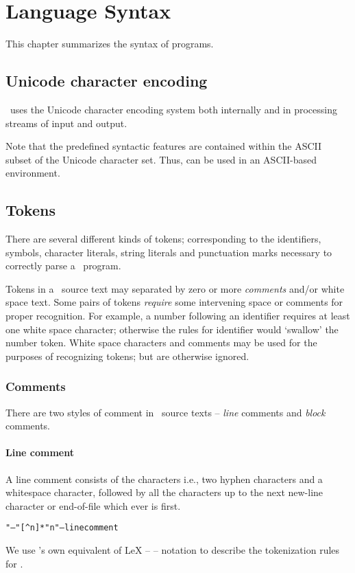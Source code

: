 \chapter{Language Syntax}
\label{grammar}

This chapter summarizes the syntax of \go programs. 

\section{Unicode character encoding}

\go\ uses the Unicode character encoding system \cite{unicode:30} both internally and in processing streams of input and output.

Note that the predefined syntactic features are contained within the ASCII subset of the Unicode character set. Thus, \go can be used in an ASCII-based environment.

\section{Tokens}
There are several different kinds of tokens; corresponding to the identifiers, symbols, character literals, string literals and punctuation marks necessary to correctly parse a \go\ program.


Tokens in a \go\ source text may separated by zero or more \emph{comments} and/or white space text. Some pairs of tokens \emph{require} some intervening space or comments for proper recognition. For example, a number following an identifier requires at least one white space character; otherwise the rules for identifier would `swallow' the number token.  White space characters and comments may be used for the purposes of recognizing tokens; but are otherwise ignored.

\subsection{Comments}
\label{token:comments}
There are two styles of comment in \go\ source texts -- \emph{line} comments and \emph{block} comments.

\subsubsection{Line comment}
\label{token:linecomment}
A line comment consists of the characters \constant{--\spce} i.e., two hyphen characters and a whitespace character, followed by all the characters up to the next new-line character or end-of-file which ever is first.
\begin{alltt}
"--"[^\bsl{}n]*"\bsl{}n"            -- line comment
\end{alltt}
\begin{aside}
We use \go's own equivalent of LeX --  -- notation to describe the tokenization rules for \go.
\end{aside}
